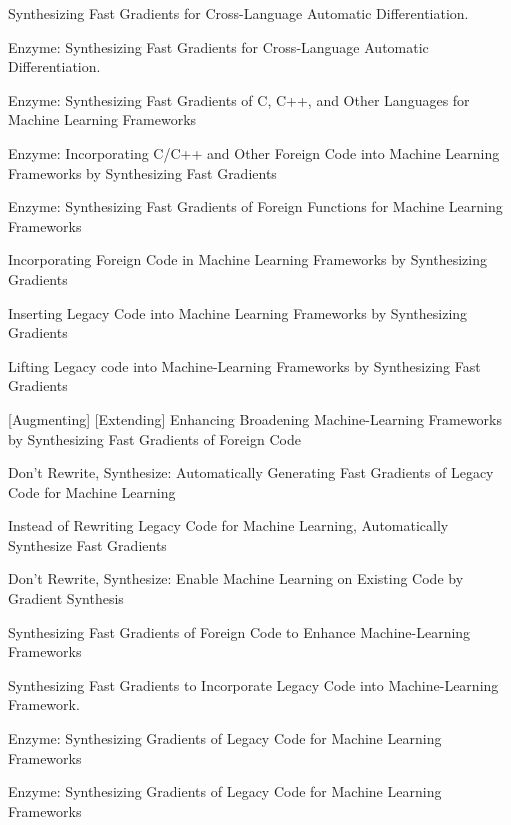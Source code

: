 
Synthesizing Fast Gradients for Cross-Language Automatic Differentiation.

Enzyme: Synthesizing Fast Gradients for Cross-Language Automatic Differentiation. 

Enzyme: Synthesizing Fast Gradients of C, C++, and Other Languages for Machine Learning Frameworks

Enzyme: Incorporating C/C++ and Other Foreign Code into Machine Learning Frameworks by Synthesizing Fast Gradients

Enzyme: Synthesizing Fast Gradients of Foreign Functions for Machine Learning Frameworks


Incorporating Foreign Code in Machine Learning Frameworks by Synthesizing Gradients

Inserting Legacy Code into Machine Learning Frameworks by Synthesizing Gradients

Lifting Legacy code into Machine-Learning Frameworks by Synthesizing Fast Gradients

[Augmenting]
[Extending]
Enhancing
Broadening Machine-Learning Frameworks by Synthesizing Fast Gradients of Foreign Code

Don't Rewrite, Synthesize: Automatically Generating Fast Gradients of Legacy Code for Machine Learning

Instead of Rewriting Legacy Code for Machine Learning, Automatically Synthesize Fast Gradients

Don't Rewrite, Synthesize: Enable Machine Learning on Existing Code by Gradient Synthesis

Synthesizing Fast Gradients of Foreign Code to Enhance Machine-Learning Frameworks

Synthesizing Fast Gradients to Incorporate Legacy Code into Machine-Learning Framework.

Enzyme: Synthesizing Gradients of Legacy Code for Machine Learning Frameworks

Enzyme: Synthesizing Gradients of Legacy Code for Machine Learning Frameworks



%
